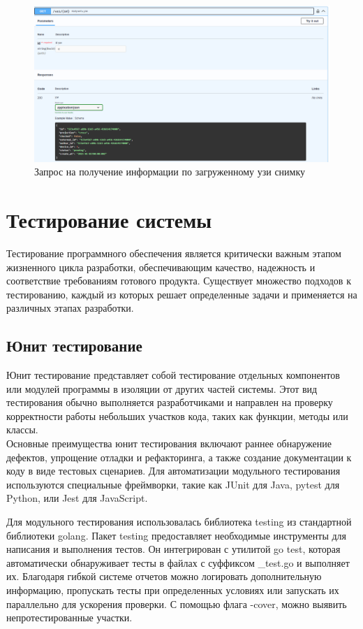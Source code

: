 \begin{figure}[H]%
	\begin{center}
		\includegraphics[width=.6\columnwidth]{./img/new/uzi_response.png}%
	\end{center}
	\caption{Запрос на получение информации по загруженному узи снимку}%
	\label{pic:uzi_response}%
\end{figure}

\section{Тестирование системы}
Тестирование программного обеспечения является критически важным этапом жизненного цикла разработки, 
обеспечивающим качество, надежность и соответствие требованиям готового продукта. Существует множество 
подходов к тестированию, каждый из которых решает определенные задачи и применяется на различных этапах 
разработки\cite{meszaros2007xunit}.

\subsection{Юнит тестирование}
Юнит тестирование представляет собой тестирование отдельных компонентов или модулей программы в изоляции 
от других частей системы. Этот вид тестирования обычно выполняется разработчиками и направлен на проверку 
корректности работы небольших участков кода, таких как функции, методы или классы.\\
Основные преимущества юнит тестирования включают раннее обнаружение дефектов, упрощение 
отладки и рефакторинга, а также создание документации к коду в виде тестовых сценариев. 
Для автоматизации модульного тестирования используются специальные фреймворки, 
такие как JUnit для Java, pytest для Python, или Jest для JavaScript.

Для модульного тестирования использовалась библиотека testing из стандартной библиотеки golang.
Пакет testing предоставляет необходимые инструменты для написания и выполнения тестов. 
Он интегрирован с утилитой go test, которая автоматически обнаруживает тесты в файлах с суффиксом \_test.go 
и выполняет их. Благодаря гибкой системе отчетов можно логировать дополнительную информацию, пропускать тесты при определенных условиях или запускать их параллельно для ускорения проверки.
С помощью флага -cover, можно выявить непротестированные участки.

